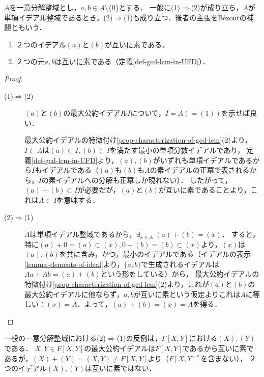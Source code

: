 \documentclass[uplatex,dvipdfmx]{jsreport}
\begin{document}
\begin{lemma}\label{lemma-characterization-of-coprime}
    $A$を一意分解整域とし，$a,b\in A\setminus\{0\}$とする．
    一般に(1)$\Rightarrow$(2)が成り立ち，$A$が単項イデアル整域であるとき，(2)$\Rightarrow$(1)も成り立つ．後者の主張をBézoutの補題ともいう．
    \begin{enumerate}
        \item ２つのイデアル$(a)$と$(b)$が互いに素である．
        \item ２つの元$a,b$は互いに素である（定義\ref{def-gcd-lcm-in-UFD}）．
    \end{enumerate}
\end{lemma}
\begin{proof}\mbox{}
    \begin{description}
        \item[(1)$\Rightarrow$(2)] 
        $(a)$と$(b)$の最大公約イデアル$I$について，$I=A(=(1))$を示せば良い．

        最大公約イデアルの特徴付け\ref{prop-characterization-of-gcd-lcm}(2)より，
        $I\subset A$は$(a)\subset I,(b)\subset I$を満たす最小の単項分数イデアルであり，
        定義\ref{def-gcd-lcm-in-UFD}より，$(a),(b)$がいずれも単項イデアルであるから$I$もイデアルである（$(a)$も$(b)$も$A$の素イデアルの正冪で表されるから，$I$の素イデアルへの分解も正冪しか現れない）．
        したがって，$(a)+(b)\subset I$が必要だが，$(a)$と$(b)$が互いに素であることより，これは$A\subset I$を意味する．
        \item[(2)$\Rightarrow$(1)]
        $A$は単項イデアル整域であるから，$\exists_{x\in A}\;(a)+(b)=(x)$．
        すると，特に$(a)+0=(a)\subset(x),0+(b)=(b)\subset(x)$より，$(x)$は$(a),(b)$を共に含み，かつ，最小のイデアルである（イデアルの表示\ref{lemma-elements-of-ideal}より，$\{a,b\}$で生成されるイデアルは$Aa+Ab=(a)+(b)$という形をしている）から，
        最大公約イデアルの特徴付け\ref{prop-characterization-of-gcd-lcm}(2)より，これが$(a)$と$(b)$の最大公約イデアルに他ならず，$a,b$が互いに素という仮定よりこれは$A$に等しい：$(x)=A$．よって，$(a)+(b)=(x)=A$を得る．
    \end{description}
\end{proof}
\begin{counterexample}
    一般の一意分解整域における(2)$\Rightarrow$(1)の反例は，$F[X,Y]$における$(X),(Y)$である．
    $X,Y\in F[X,Y]$の最大公約イデアルは$F[X,Y]$であるから互いに素であるが，$(X)+(Y)=(X,Y)\ne F[X,Y]$より（$F[X,Y]^\times$を含まない），
    ２つのイデアル$(X),(Y)$は互いに素ではない．
\end{counterexample}
\end{document}
